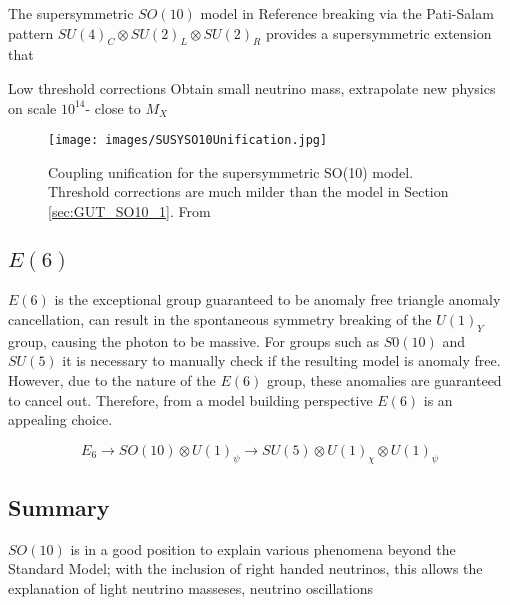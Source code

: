 \documentclass{article}
\begin{document}
The supersymmetric $SO(10)$ model in Reference \cite{SUSYSO10} breaking via the Pati-Salam pattern $SU(4)_C \otimes SU(2)_L \otimes SU(2)_R$ provides a supersymmetric extension that 


Low threshold corrections
Obtain small neutrino mass, extrapolate new physics on scale $10^{14}$- close to $M_X$

\begin{figure}
    \centering
    \label{fig:SUSYSO10Coupling}
    \texttt{[image: images/SUSYSO10Unification.jpg]}
    \caption{Coupling unification for the supersymmetric SO(10) model. Threshold corrections are much milder than the model in Section \ref{sec:GUT_SO10_1}. From \cite{SUSYSO10}}
\end{figure}

\subsection{$E(6)$}%
\label{sec:GUT_E6}
%
$E(6)$ is the exceptional group guaranteed to be anomaly free triangle anomaly cancellation, can result in the spontaneous symmetry breaking of the $U(1)_Y$ group, causing the photon to be massive. For groups such as $S0(10)$ and $SU(5)$ it is necessary to manually check if the resulting model is anomaly free. However, due to the nature of the $E(6)$ group, these anomalies are guaranteed to cancel out. Therefore, from a model building perspective $E(6)$ is an appealing choice. 

\begin{equation}
E_6 \rightarrow SO(10) \otimes U(1)_\psi \rightarrow SU(5)\otimes U(1)_\chi \otimes U(1)_\psi
\end{equation}

\subsection{Summary}%
\label{sec:GUT_Summary}
$SO(10)$ is in a good position to explain various phenomena beyond the Standard Model; with the inclusion of right handed neutrinos, this allows the explanation of light neutrino masseses, neutrino oscillations
\end{document}
